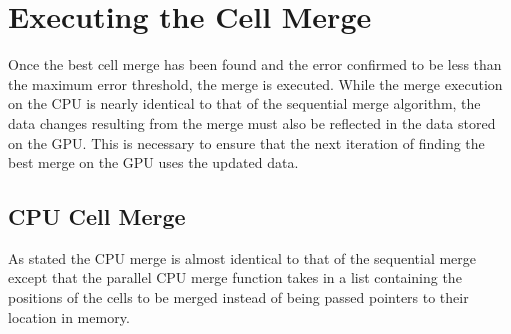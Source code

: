 \section{Executing the Cell Merge}
Once the best cell merge has been found and the error confirmed to be less than the maximum error threshold, the merge is executed. While the merge execution on the CPU is nearly identical to that of the sequential merge algorithm, the data changes resulting from the merge must also be reflected in the data stored on the GPU. This is necessary to ensure that the next iteration of finding the best merge on the GPU uses the updated data.

\subsection{CPU Cell Merge}
As stated the CPU merge is almost identical to that of the sequential merge except that the parallel CPU merge function takes in a list containing the positions of the cells to be merged instead of being passed pointers to their location in memory.


